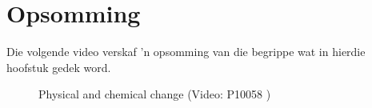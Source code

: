             \section{Opsomming}
            \nopagebreak
\label{m38711*id972312}
Die volgende video verskaf 'n opsomming van die begrippe wat in hierdie hoofstuk gedek word.
    \setcounter{subfigure}{0}
	\begin{figure}[H] %
    \textnormal{Physical and chemical change}\vspace{.1in} \nopagebreak
  \label{m38711*yt-media1}\label{m38711*yt-video1}
             { (Video:  P10058 )}
 \end{figure}       
\par  \vspace{-1cm}
